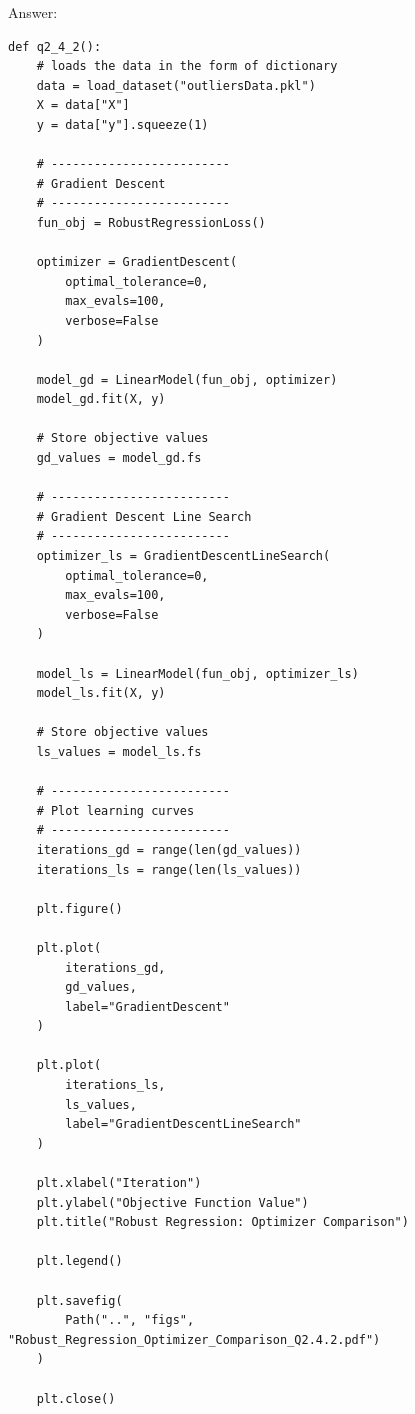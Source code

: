 \documentclass{article}
\newenvironment{answer}{\par\begingroup\color{gre}Answer: }{\endgroup}
\begin{document}
\begin{answer}
\begin{lstlisting}
def q2_4_2():
    # loads the data in the form of dictionary
    data = load_dataset("outliersData.pkl")
    X = data["X"]
    y = data["y"].squeeze(1)

    # -------------------------
    # Gradient Descent
    # -------------------------
    fun_obj = RobustRegressionLoss()

    optimizer = GradientDescent(
        optimal_tolerance=0,
        max_evals=100,
        verbose=False
    )

    model_gd = LinearModel(fun_obj, optimizer)
    model_gd.fit(X, y)

    # Store objective values
    gd_values = model_gd.fs

    # -------------------------
    # Gradient Descent Line Search
    # -------------------------
    optimizer_ls = GradientDescentLineSearch(
        optimal_tolerance=0,
        max_evals=100,
        verbose=False
    )

    model_ls = LinearModel(fun_obj, optimizer_ls)
    model_ls.fit(X, y)

    # Store objective values
    ls_values = model_ls.fs

    # -------------------------
    # Plot learning curves
    # -------------------------
    iterations_gd = range(len(gd_values))
    iterations_ls = range(len(ls_values))

    plt.figure()

    plt.plot(
        iterations_gd,
        gd_values,
        label="GradientDescent"
    )

    plt.plot(
        iterations_ls,
        ls_values,
        label="GradientDescentLineSearch"
    )

    plt.xlabel("Iteration")
    plt.ylabel("Objective Function Value")
    plt.title("Robust Regression: Optimizer Comparison")

    plt.legend()

    plt.savefig(
        Path("..", "figs", "Robust_Regression_Optimizer_Comparison_Q2.4.2.pdf")
    )

    plt.close()
\end{lstlisting}
\end{answer}
\end{document}
